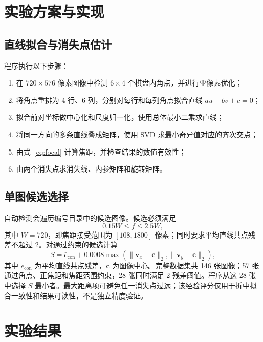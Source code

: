 \documentclass[UTF8,a4paper,12pt]{ctexart}
\begin{document}
\section{实验方案与实现}

\subsection{直线拟合与消失点估计}

程序执行以下步骤：
\begin{enumerate}
  \item 在 $720\times576$ 像素图像中检测 $6\times4$ 个棋盘内角点，并进行亚像素优化；
  \item 将角点重排为 4 行、6 列，分别对每行和每列角点拟合直线 $au+bv+c=0$；
  \item 拟合前对坐标做中心化和尺度归一化，使用总体最小二乘求直线；
  \item 将同一方向的多条直线叠成矩阵，使用 SVD 求最小奇异值对应的齐次交点；
  \item 由式~\eqref{eq:focal} 计算焦距，并检查结果的数值有效性；
  \item 由两个消失点求消失线、内参矩阵和旋转矩阵。
\end{enumerate}

\subsection{单图候选选择}

自动检测会遍历编号目录中的候选图像。候选必须满足
\begin{equation}
  0.15W\leq f\leq2.5W,
\end{equation}
其中 $W=720$，即焦距接受范围为 $[108,1800]$ 像素；同时要求平均直线共点残差不超过 \SI{2}{\pixel}。对通过约束的候选计算
\begin{equation}
  S=\bar e_{\mathrm{con}}+0.0008\max\left(
  \lVert\bm v_x-\bm c\rVert_2,\lVert\bm v_y-\bm c\rVert_2\right),
\end{equation}
其中 $\bar e_{\mathrm{con}}$ 为平均直线共点残差，$\bm c$ 为图像中心。完整数据集共 146 张图像；57 张通过角点、正焦距和焦距范围约束，28 张同时满足 \SI{2}{\pixel} 残差阈值。程序从这 28 张中选择 $S$ 最小者。最大距离项可避免任一消失点过远；该经验评分仅用于折中拟合一致性和结果可读性，不是独立精度验证。

\section{实验结果}
\end{document}
